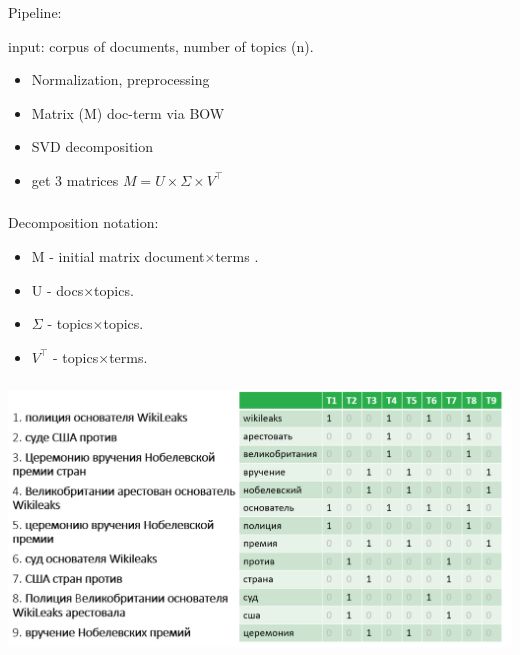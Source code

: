 \documentclass[t, 11pt]{beamer}
\begin{document}
\begin{frame}
	\frametitle{\insertsection}
	\frametitle{\insertsubsection}  
	Pipeline:
	
	\vspace{0.5cm}
	input: corpus of documents, number of topics (n).
	\vspace{0.5cm}
	
	\begin{itemize}
		\item Normalization, preprocessing
		\item Matrix (M) doc-term via BOW 
		\item SVD decomposition 
		\item get 3 matrices $M=U\times\Sigma\times V^\intercal$  
	\end{itemize}	
	\vspace{0.5cm}
	
\end{frame}
\begin{frame}
	\frametitle{\insertsection}
	\frametitle{\insertsubsection}  
	Decomposition notation:

	\vspace{0.5cm}
	
	\begin{itemize}
		\item M - initial matrix document$\times$terms .
		\item U - docs$\times$topics.
		\item $\Sigma$ - topics$\times$topics.
		\item $V^\intercal$ - topics$\times$terms.   
	\end{itemize}	
	\vspace{0.5cm}
	
\end{frame}

	\begin{frame}
	\frametitle{\insertsection}
	\frametitle{\insertsubsection}
	
	
	\includegraphics[width=0.9\linewidth]{init.png}
\end{frame}
\end{document}

